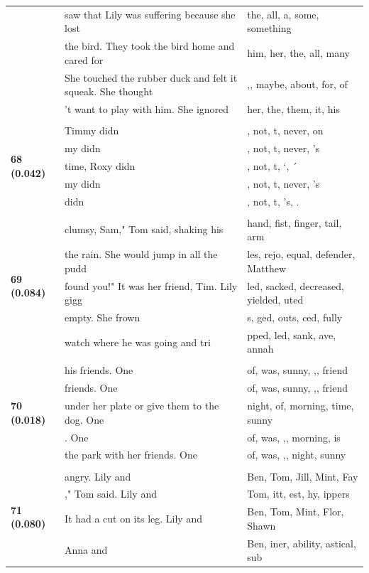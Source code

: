 \documentclass{article}
\theoremstyle{plain}
\theoremstyle{definition}
\theoremstyle{remark}
\begin{document}
\begin{longtable}{|p{}|p{}|p{}|}
& saw that Lily was suffering because she lost & the,  all,  a,  some,  something \\
& the bird. They took the bird home and cared for & him,  her,  the,  all,  many \\
& She touched the rubber duck and felt it squeak.  She thought & ,,  maybe,  about,  for,  of \\
& 't want to play with him. She ignored & her,  the,  them,  it,  his \\
& & \\
\multirow{5}{*}{\textbf{68 (0.042)}} & Timmy didn & ,  not, t,  never, on \\
& my didn & ,  not, t,  never, 's \\
& time, Roxy didn & ,  not, t, `, ´ \\
& my didn & ,  not, t,  never, 's \\
& didn & ,  not, t, 's, . \\
& & \\
\multirow{5}{*}{\textbf{69 (0.084)}} & clumsy, Sam," Tom said, shaking his & hand,  fist,  finger,  tail,  arm \\
& the rain. She would jump in all the pudd & les,  rejo,  equal,  defender, Matthew \\
& found you!" It was her friend, Tim.   Lily gigg & led,  sacked,  decreased,  yielded, uted \\
& empty. She frown & s, ged, outs, ced, fully \\
& watch where he was going and tri & pped, led,  sank, ave, annah \\
& & \\
\multirow{5}{*}{\textbf{70 (0.018)}} & his friends. One & of,  was,  sunny, ,,  friend \\
& friends. One & of,  was,  sunny, ,,  friend \\
& under her plate or give them to the dog.  One & night,  of,  morning,  time,  sunny \\
& . One & of,  was, ,,  morning,  is \\
& the park with her friends. One & of,  was, ,,  night,  sunny \\
& & \\
\multirow{5}{*}{\textbf{71 (0.080)}} & angry.  Lily and & Ben,  Tom,  Jill,  Mint,  Fay \\
& ," Tom said.  Lily and & Tom, itt, est, hy, ippers \\
& It had a cut on its leg. Lily and & Ben,  Tom,  Mint,  Flor,  Shawn \\
& Anna and & Ben, iner, ability, astical, sub \\

\end{longtable}
\end{document}
